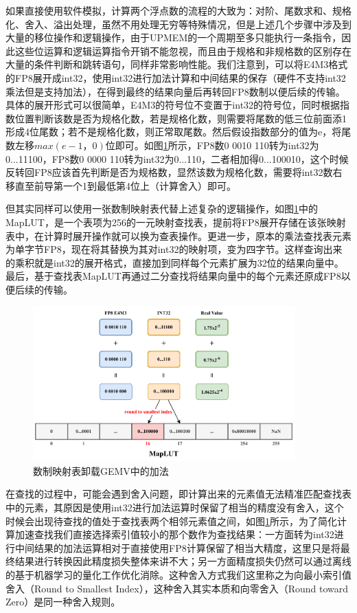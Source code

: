 如果直接使用软件模拟，计算两个浮点数的流程的大致为：对阶、尾数求和、规格化、舍入、溢出处理，虽然不用处理无穷等特殊情况，但是上述几个步骤中涉及到大量的移位操作和逻辑操作，由于UPMEM的一个周期至多只能执行一条指令\cite{UPMEMHotChips}，因此这些位运算和逻辑运算指令开销不能忽视，而且由于规格和非规格数的区别存在大量的条件判断和跳转语句，同样非常影响性能。我们注意到，可以将E4M3格式的FP8展开成int32，使用int32进行加法计算和中间结果的保存（硬件不支持int32乘法但是支持加法），在得到最终的结果向量后再转回FP8数制以便后续的传输。具体的展开形式可以很简单，E4M3的符号位不变置于int32的符号位，同时根据指数位置判断该数是否为规格化数，若是规格化数，则需要将尾数的低三位前面添1形成4位尾数；若不是规格化数，则正常取尾数。然后假设指数部分的值为e，将尾数左移$max(e-1，0)$位即可。如图\ref{LUTBS}所示，FP8数0 0010 110转为int32为0...11100，FP8数0 0000 110转为int32为0...110，二者相加得0...100010，这个时候反转回FP8应该首先判断是否为规格数，显然该数为规格化数，需要将int32数右移直至前导第一个1到最低第4位上（计算舍入）即可。

但其实同样可以使用一张数制映射表代替上述复杂的逻辑操作，如图\ref{LUTBS}中的MapLUT，是一个表项为256的一元映射查找表，提前将FP8展开存储在该张映射表中，在计算时展开操作就可以换为查表操作。更进一步，原本的乘法查找表元素为单字节FP8，现在将其替换为其对int32的映射项，变为四字节。这样查询出来的乘积就是int32的展开格式，直接加到同样每个元素扩展为32位的结果向量中。最后，基于查找表MapLUT再通过二分查找将结果向量中的每个元素还原成FP8以便后续的传输。

\begin{figure}[!htbp]
	\centering
    \includegraphics[width=0.9\textwidth]{figures/BinarySearch.pdf}
	\caption{数制映射表卸载GEMV中的加法}
    \label{LUTBS}
\end{figure}

在查找的过程中，可能会遇到舍入问题，即计算出来的元素值无法精准匹配查找表中的元素，其原因是使用int32进行加法运算时保留了相当的精度没有舍入，这个时候会出现待查找的值处于查找表两个相邻元素值之间，如图\ref{LUTBS}所示，为了简化计算加速查找我们直接选择索引值较小的那个数作为查找结果：一方面转为int32进行中间结果的加法运算相对于直接使用FP8计算保留了相当大精度，这里只是将最终结果进行转换因此精度损失整体来讲不大；另一方面精度损失仍然可以通过离线的基于机器学习的量化工作优化消除。这种舍入方式我们这里称之为向最小索引值舍入（Round to Smallest Index），这种舍入其实本质和向零舍入（Round toward Zero）是同一种舍入规则。

